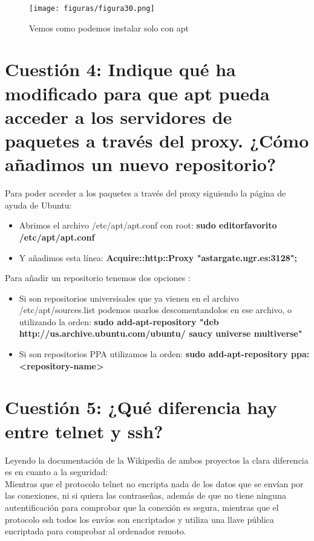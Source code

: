 \begin{figure}[H] %
	\centering
	\texttt{[image: figuras/figura30.png]}  %
	\label{figura30}
	
	\caption{Vemos como podemos instalar solo con apt} 
\end{figure}


\section{Cuestión 4: Indique qué ha modificado para que apt pueda acceder a los servidores de paquetes a través del proxy. ¿Cómo añadimos un nuevo repositorio?}
Para poder acceder a los paquetes a través del proxy siguiendo la página de ayuda de Ubuntu\cite{apt-proxy}:\\
\begin{itemize}
	\item Abrimos el archivo /etc/apt/apt.conf con root: 	\textbf{sudo editorfavorito /etc/apt/apt.conf}
	\item Y añadimos esta línea: \textbf{Acquire::http::Proxy "astargate.ugr.es:3128";}
\end{itemize}
Para añadir un repositorio tenemos dos opciones \cite{apt-repositorie}:
\begin{itemize}
	\item Si son repositorios universisales que ya vienen en el archivo  /etc/apt/sources.list podemos usarlos descomentandolos en ese archivo, o utilizando la orden: \textbf{sudo add-apt-repository "deb http://us.archive.ubuntu.com/ubuntu/ saucy universe multiverse"}
	\item Si son repositorios PPA utilizamos la orden: \textbf{sudo add-apt-repository ppa:<repository-name>}
\end{itemize}


\section{Cuestión 5: ¿Qué diferencia hay entre telnet y ssh?}
Leyendo la documentación de la Wikipedia de ambos proyectos \cite{telnet1} \cite{ssh1} la clara diferencia es en cuanto a la seguridad:\\
Mientras que el protocolo telnet no encripta nada de los datos que se envían por las conexiones, ni si quiera las contraseñas, además de que no tiene ninguna autentificación para comprobar que la conexión es segura, mientras que el protocolo ssh todos los envíos son encriptados y utiliza una llave pública encriptada para comprobar al ordenador remoto.

